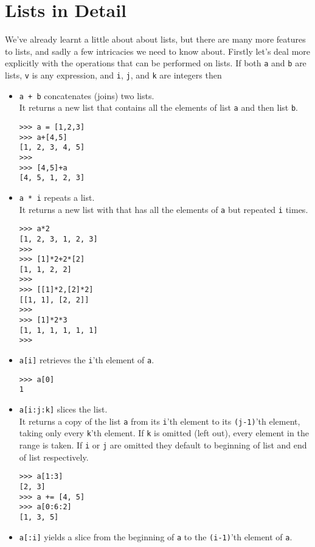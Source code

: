 \section{Lists in Detail}

We've already learnt a little about about lists, but there are many   more features to lists, and sadly a   few intricacies we need to know about. Firstly let's deal more   explicitly with the operations that can be performed on lists. If both   \texttt{a} and \texttt{b} are lists, \texttt{v} is any expression, and \texttt{i}, \texttt{j}, and \texttt{k} are   integers then
\begin{itemize}
	\item 
\texttt{a + b} concatenates (joins) two lists. \\
It returns a new list that contains all the elements of list \texttt{a} and then list \texttt{b}.
\begin{lstlisting}
>>> a = [1,2,3]
>>> a+[4,5]
[1, 2, 3, 4, 5]
>>>
>>> [4,5]+a
[4, 5, 1, 2, 3]
\end{lstlisting}
	\item 
\texttt{a * i} repeats a list. \\
It returns a new list with that has all the elements of \texttt{a} but repeated \texttt{i} times.
\begin{lstlisting}
>>> a*2
[1, 2, 3, 1, 2, 3]
>>>
>>> [1]*2+2*[2]
[1, 1, 2, 2]
>>>
>>> [[1]*2,[2]*2]
[[1, 1], [2, 2]]
>>>
>>> [1]*2*3
[1, 1, 1, 1, 1, 1]
>>>
\end{lstlisting}
	\item 
\texttt{a[i]} retrieves the \texttt{i}'th element of    \texttt{a}.
\begin{lstlisting}
>>> a[0]
1
\end{lstlisting}
	\item 
\texttt{a[i:j:k]} slices the list. \\
It returns a copy of the list \texttt{a}    from its \texttt{i}'th element to its \texttt{(j-1)}'th element, taking only every    \texttt{k}'th element. If \texttt{k} is omitted (left out), every element in the range is    taken. If \texttt{i} or \texttt{j} are omitted they default to beginning of list    and end of list respectively.
\begin{lstlisting}
>>> a[1:3]
[2, 3]
>>> a += [4, 5]
>>> a[0:6:2]
[1, 3, 5]
\end{lstlisting}
	\item 
\texttt{a[:i]} yields a slice from the beginning of \texttt{a} to    the \texttt{(i-1)}'th element of \texttt{a}.

\end{itemize}
